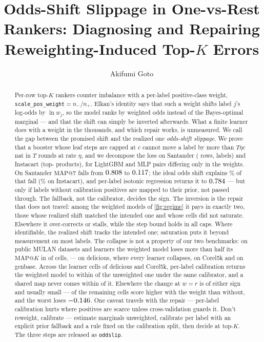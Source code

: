 \documentclass[sigconf,nonacm]{acmart}
\makeatletter
\newcommand{\mapk}{\mathrm{MAP}@K\xspace}
\newcommand{\mapseven}{\mathrm{MAP}@7\xspace}
\makeatother
\begin{document}
\title{Odds-Shift Slippage in One-vs-Rest Rankers: Diagnosing and Repairing Reweighting-Induced Top-$K$ Errors}

\author{Akifumi Goto}

\begin{abstract}
Per-row top-$K$ rankers counter imbalance with a per-label positive-class weight, \texttt{scale\_pos\_weight}$=n_-/n_+$. Elkan's identity says that such a weight shifts label $j$'s log-odds by $\ln w_j$, so the model ranks by weighted odds instead of the Bayes-optimal marginal --- and that the shift can simply be inverted afterwards. What a finite learner does with a weight in the thousands, and which repair works, is unmeasured.
We call the gap between the promised shift and the realized one \emph{odds-shift slippage}. We prove that a booster whose leaf steps are capped at $c$ cannot move a label by more than $T\eta c$ nat in $T$ rounds at rate $\eta$, and we decompose the loss on Santander (\nnTest{} rows, \nnLabels{} labels) and Instacart (top-\nInLabels{} products), for LightGBM and MLP pairs differing only in the weights. On Santander $\mapseven$ falls from $0.808$ to $0.117$; the ideal odds shift explains \noddsShare\% of that fall (\nIoddsShare\% on Instacart), and per-label isotonic regression returns it to $0.784$ --- but only if labels without calibration positives are mapped to their prior, not passed through. The fallback, not the calibrator, decides the sign.
The inversion is the repair that does not travel: among the weighted models of \cref{fig:regime} it pays in exactly two, those whose realized shift matched the intended one and whose cells did not saturate. Elsewhere it over-corrects or stalls, while the step bound holds in all \ncapN{} caps. Where identifiable, the realized shift tracks the intended one; saturation puts it beyond measurement on most labels. The collapse is not a property of our two benchmarks: on \nnMulan{} public MULAN datasets and \nnLearners{} learners the weighted model loses more than half its $\mapk$ in \nnCollapseCells{} of \nnDoseCells{} cells, --- \nnDelCollapseLearners{} on delicious, where every learner collapses, \nnCorelCollapseLearners{} on Corel5k and \nnOtherCollapseCells{} on genbase. Across the \nnRepairCollapseCells{} learner cells of delicious and Corel5k, per-label calibration returns the weighted model to within \nmaxRepairGapCollapse{} of the unweighted one under the same calibrator, and a shared map never comes within \nminPooledGapCollapse{} of it. Elsewhere the change at $w{=}r$ is of either sign and usually small --- \nnDoseGain{} of the remaining cells score higher with the weight than without, and the worst loses $-0.146$. One caveat travels with the repair --- per-label calibration hurts where positives are scarce unless cross-validation guards it. Don't reweight, calibrate --- estimate marginals unweighted, calibrate per label with an explicit prior fallback and a rule fixed on the calibration split, then decide at top-$K$. The three steps are released as \texttt{oddslip}.
\end{abstract}
\end{document}
